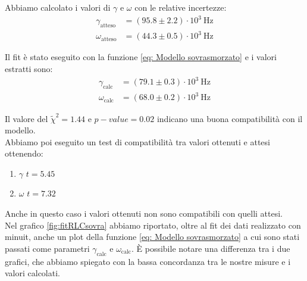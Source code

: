 \documentclass[letterpaper,12pt]{article}
\begin{document}
Abbiamo calcolato i valori di $\gamma$ e $\omega$ con le relative incertezze:
\begin{align*}
	\gamma_\text{atteso} & = (95.8 \pm 2.2) \cdot 10^3\ \text{Hz} \\
	\omega_\text{atteso} & = (44.3 \pm 0.5) \cdot 10^3\ \text{Hz}
\end{align*}

Il fit è stato eseguito con la funzione \eqref{eq: Modello sovrasmorzato} e i valori estratti sono:
\begin{align*}
	\gamma_\text{calc} & = (79.1 \pm 0.3) \cdot 10^3\ \text{Hz} \\
	\omega_\text{calc} & = (68.0 \pm 0.2) \cdot 10^3\ \text{Hz}
\end{align*}

Il valore del $\widetilde{\chi}^2 = 1.44$ e $p-value = 0.02$ indicano una buona compatibilità con il modello.\\

Abbiamo poi eseguito un test di compatibilità tra valori ottenuti e attesi ottenendo:
\begin{enumerate}
	\item $\gamma$ \quad  $t = 5.45$
    \item $\omega$ \quad $t = 7.32$
\end{enumerate}
Anche in questo caso i valori ottenuti non sono compatibili con quelli attesi.\\

Nel grafico \ref{fig:fitRLCsovra} abbiamo riportato, oltre al fit dei dati realizzato con minuit, anche un plot della funzione \eqref{eq: Modello sovrasmorzato} a cui sono stati passati come parametri $\gamma_\text{calc}$ e $\omega_\text{calc}$. È possibile notare una differenza tra i due grafici, che abbiamo spiegato con la bassa concordanza tra le nostre misure e i valori calcolati.
\end{document}
